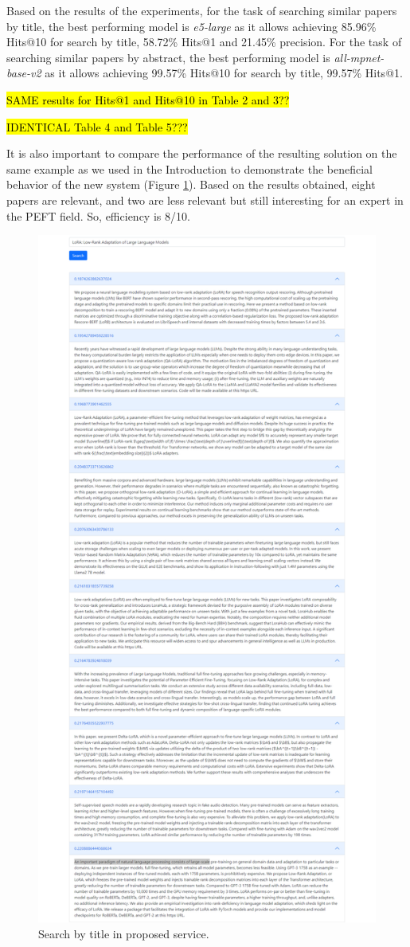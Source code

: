 \documentclass{article}
\begin{document}
        
    
        Based on the results of the experiments, for the task of searching similar papers by title, the best performing model is \textit{e5-large} as it allows achieving 85.96\% Hits@10 for search by title, 58.72\% Hits@1 and 21.45\% precision. For the task of searching similar papers by abstract, the best performing model is \textit{all-mpnet-base-v2} as it allows achieving 99.57\% Hits@10 for search by title, 99.57\% Hits@1.
    
        \hl{SAME results for Hits@1 and Hits@10 in Table 2 and 3??}
    
        \hl{IDENTICAL Table 4 and Table 5???}
    
        It is also important to compare the performance of the resulting solution on the same example as we used in the Introduction to demonstrate the beneficial behavior of the new system (Figure \ref{fig:aziri-search}). Based on the results obtained, eight papers are relevant, and two are less relevant but still interesting for an expert in the PEFT field. So, efficiency is 8/10.
    
        \begin{figure}[H]
            \centering
            \includegraphics[width=0.7\linewidth]{img/search_aziri.png}
            \caption{Search by title in proposed service.}
            \label{fig:aziri-search}
        \end{figure}
    
\end{document}
